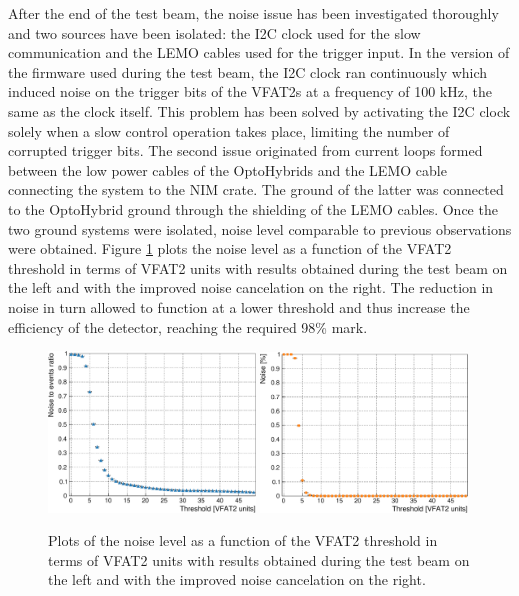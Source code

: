       After the end of the test beam, the noise issue has been investigated thoroughly and two sources have been isolated: the I2C clock used for the slow communication and the LEMO cables used for the trigger input. In the version of the firmware used during the test beam, the I2C clock ran continuously which induced noise on the trigger bits of the VFAT2s at a frequency of 100 kHz, the same as the clock itself. This problem has been solved by activating the I2C clock solely when a slow control operation takes place, limiting the number of corrupted trigger bits. The second issue originated from current loops formed between the low power cables of the OptoHybrids and the LEMO cable connecting the system to the NIM crate. The ground of the latter was connected to the OptoHybrid ground through the shielding of the LEMO cables. Once the two ground systems were isolated, noise level comparable to previous observations were obtained. Figure \ref{fig:II-3-noise-comp} plots the noise level as a function of the VFAT2 threshold in terms of VFAT2 units with results obtained during the test beam on the left and with the improved noise cancelation on the right. The reduction in noise in turn allowed to function at a lower threshold and thus increase the efficiency of the detector, reaching the required 98\% mark. \\

      \begin{figure}[h!]
        \centering
        \includegraphics[width=0.49\textwidth]{img/plots/cThresholdScan_GEM0-crop}
        \includegraphics[width=0.49\textwidth]{img/plots/cThreshold_SBitsTK-crop}
        \caption{Plots of the noise level as a function of the VFAT2 threshold in terms of VFAT2 units with results obtained during the test beam on the left and with the improved noise cancelation on the right.}
        \label{fig:II-3-noise-comp}
      \end{figure}

